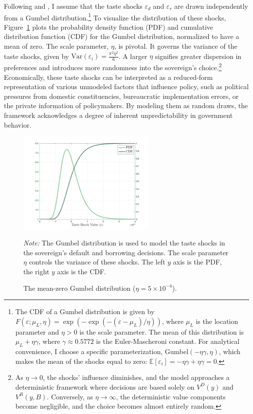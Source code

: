 \documentclass[12pt]{article}
\theoremstyle{plain}
\begin{document}
Following \citep{DvorkinSancheSaprizaYurdagul2021} and
\citep{MIHALACHEOREEF2024}, I assume that the taste shocks $\varepsilon_d$ and
$\varepsilon_r$ are drawn independently from a Gumbel
distribution.\footnote{The CDF of a Gumbel distribution is given by
	$F(\varepsilon; \mu_L, \eta) = \exp(-\exp(-(\varepsilon-\mu_L)/\eta))$, where
	$\mu_L$ is the location parameter and $\eta > 0$ is the scale parameter. The
	mean of this distribution is $\mu_L + \eta\gamma$, where $\gamma \approx
		0.5772$ is the Euler-Mascheroni constant. For analytical convenience, I choose
	a specific parameterization, Gumbel$(-\eta\gamma, \eta)$, which makes the mean
	of the shocks equal to zero: $\mathbb{E}[\varepsilon_i] = -\eta\gamma +
		\eta\gamma = 0$.} To visualize the distribution of these shocks,
Figure~\ref{fig:gumbel_dist} plots the probability density function (PDF) and
cumulative distribution function (CDF) for the Gumbel distribution, normalized
to have a mean of zero. The scale parameter, $\eta$, is pivotal. It governs the
variance of the taste shocks, given by $\text{Var}(\varepsilon_i) = \frac{\pi^2
		\eta^2}{6}$. A larger $\eta$ signifies greater dispersion in preferences and
introduces more randomness into the sovereign's choice.\footnote{As $\eta \to
		0$, the shocks' influence diminishes, and the model approaches a deterministic
	framework where decisions are based solely on $V^D(y)$ and $V^R(y,B)$.
	Conversely, as $\eta \to \infty$, the deterministic value components become
	negligible, and the choice becomes almost entirely random.} Economically, these
taste shocks can be interpreted as a reduced-form representation of various
unmodeled factors that influence policy, such as political pressures from
domestic constituencies, bureaucratic implementation errors, or the private
information of policymakers. By modeling them as random draws, the framework
acknowledges a degree of inherent unpredictability in government behavior.
\begin{figure}[htbp]
	\centering
	\includegraphics[width=0.6\textwidth]{gumbel_distribution.png}
	\caption{The mean-zero Gumbel distribution ($\eta=5\times 10^{-4}$).}
	\label{fig:gumbel_dist}
	\parbox{\linewidth}{\small\textit{Note:} The Gumbel distribution is used to model the taste shocks in the sovereign's default and borrowing decisions. The scale parameter $\eta$ controls the variance of these shocks. The left $y$ axis is the PDF, the right $y$ axis is the CDF.}
\end{figure}
\end{document}
